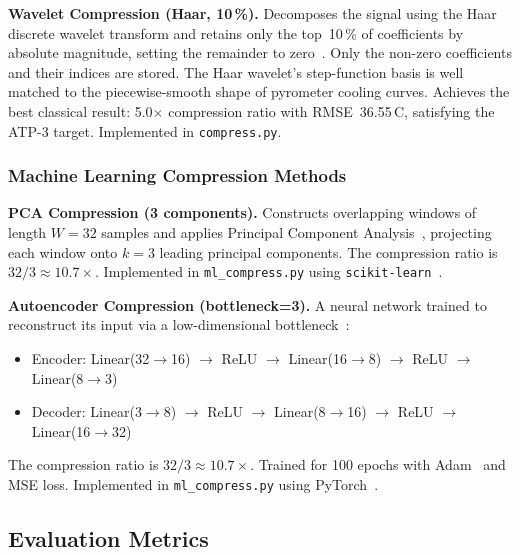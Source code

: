 \textbf{Wavelet Compression (Haar, 10\,\%).} Decomposes the signal using the Haar discrete wavelet transform and retains only the top~10\,\% of coefficients by absolute magnitude, setting the remainder to zero~\cite{learnable_wavelet}. Only the non-zero coefficients and their indices are stored. The Haar wavelet's step-function basis is well matched to the piecewise-smooth shape of pyrometer cooling curves. Achieves the best classical result: 5.0$\times$ compression ratio with RMSE~36.55\,\textdegree C, satisfying the ATP-3 target. Implemented in \texttt{compress.py}.

\subsubsection*{Machine Learning Compression Methods}

\textbf{PCA Compression (3 components).} Constructs overlapping windows of length $W=32$ samples and applies Principal Component Analysis~\cite{jolliffe2002principal}, projecting each window onto $k=3$ leading principal components. The compression ratio is $32/3 \approx 10.7\times$. Implemented in \texttt{ml\_compress.py} using \texttt{scikit-learn}~\cite{scikit-learn}.

\textbf{Autoencoder Compression (bottleneck=3).} A neural network trained to reconstruct its input via a low-dimensional bottleneck~\cite{autoencoder_compression}:
\begin{itemize}[nosep]
\item Encoder: Linear(32$\to$16) $\to$ ReLU $\to$ Linear(16$\to$8) $\to$ ReLU $\to$ Linear(8$\to$3)
\item Decoder: Linear(3$\to$8) $\to$ ReLU $\to$ Linear(8$\to$16) $\to$ ReLU $\to$ Linear(16$\to$32)
\end{itemize}
The compression ratio is $32/3 \approx 10.7\times$. Trained for 100 epochs with Adam~\cite{kingma2014adam} and MSE loss. Implemented in \texttt{ml\_compress.py} using PyTorch~\cite{pytorch}.

\subsection{Evaluation Metrics}
\label{subsec:metrics}

